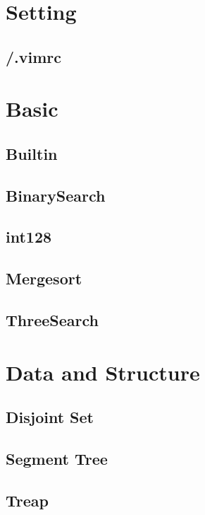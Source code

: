 \section{Setting}

\subsection{/.vimrc}



\section{Basic}

\subsection{Builtin}

\subsection{BinarySearch}

\subsection{int128}

\subsection{Mergesort}

\subsection{ThreeSearch}


\section{Data and Structure}

\subsection{Disjoint Set}

\subsection{Segment Tree}

\subsection{Treap}



